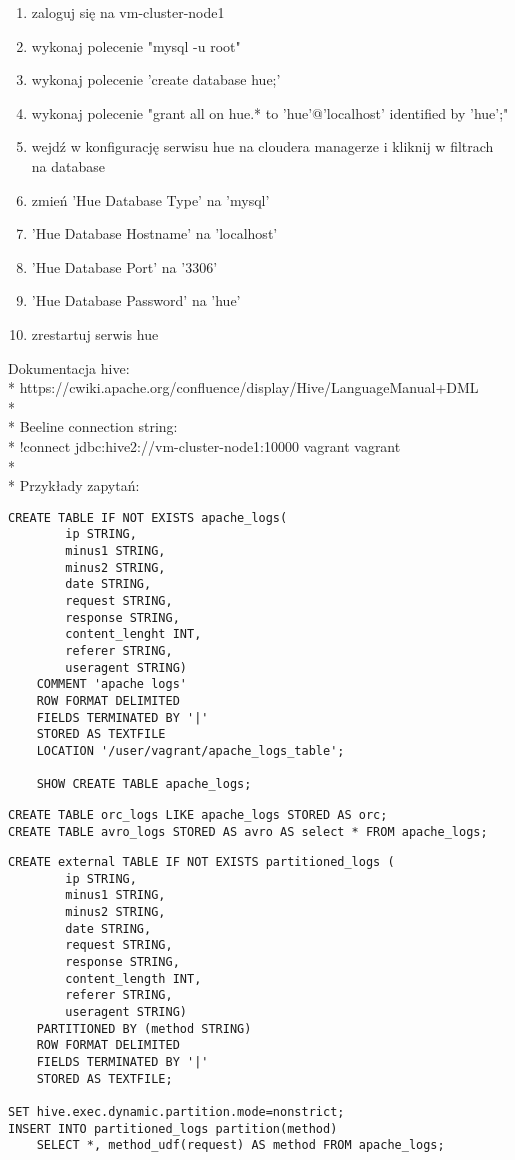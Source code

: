 \documentclass[11pt]{article}
\begin{document}
\begin{enumerate}
\item zaloguj się na vm-cluster-node1
\item wykonaj polecenie "mysql -u root"
\item wykonaj polecenie 'create database hue;'
\item wykonaj polecenie "grant all on hue.* to 'hue'@'localhost' identified by 'hue';"
\item wejdź w konfigurację serwisu hue na cloudera managerze i kliknij w filtrach na database
\item zmień 'Hue Database Type' na 'mysql'
\item 'Hue Database Hostname' na 'localhost'
\item 'Hue Database Port' na '3306'
\item 'Hue Database Password' na 'hue'
\item zrestartuj serwis hue
\end{enumerate}

\pagebreak

Dokumentacja hive:
\\*
https://cwiki.apache.org/confluence/display/Hive/LanguageManual+DML
\\*
\\*
Beeline connection string:
\\*
!connect jdbc:hive2://vm-cluster-node1:10000 vagrant vagrant
\\*
\\*
Przykłady zapytań:
\begin{lstlisting}
CREATE TABLE IF NOT EXISTS apache_logs(
        ip STRING,
        minus1 STRING,
        minus2 STRING,
        date STRING,
        request STRING,
        response STRING,
        content_lenght INT,
        referer STRING,
        useragent STRING)
    COMMENT 'apache logs'
    ROW FORMAT DELIMITED
    FIELDS TERMINATED BY '|'
    STORED AS TEXTFILE
    LOCATION '/user/vagrant/apache_logs_table';
    
    SHOW CREATE TABLE apache_logs;	
\end{lstlisting}
\begin{lstlisting}
CREATE TABLE orc_logs LIKE apache_logs STORED AS orc;
CREATE TABLE avro_logs STORED AS avro AS select * FROM apache_logs;
\end{lstlisting}

\pagebreak

\begin{lstlisting}
CREATE external TABLE IF NOT EXISTS partitioned_logs (
		ip STRING,
		minus1 STRING,
		minus2 STRING,
		date STRING,
		request STRING,
		response STRING,
		content_length INT,
		referer STRING,
		useragent STRING)
	PARTITIONED BY (method STRING)
	ROW FORMAT DELIMITED
	FIELDS TERMINATED BY '|'
	STORED AS TEXTFILE;
        
SET hive.exec.dynamic.partition.mode=nonstrict;
INSERT INTO partitioned_logs partition(method)
	SELECT *, method_udf(request) AS method FROM apache_logs;        
\end{lstlisting}
\end{document}
